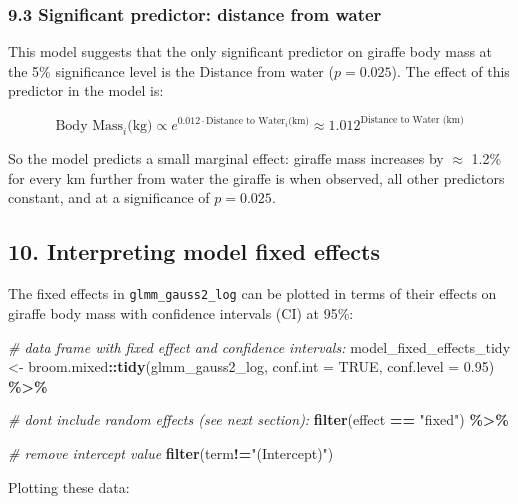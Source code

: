 \documentclass[
]{article}
\newenvironment{Shaded}{\begin{snugshade}}{\end{snugshade}}
\newcommand{\AttributeTok}[1]{\textcolor[rgb]{0.13,0.29,0.53}{#1}}
\newcommand{\CommentTok}[1]{\textcolor[rgb]{0.56,0.35,0.01}{\textit{#1}}}
\newcommand{\ConstantTok}[1]{\textcolor[rgb]{0.56,0.35,0.01}{#1}}
\newcommand{\FloatTok}[1]{\textcolor[rgb]{0.00,0.00,0.81}{#1}}
\newcommand{\FunctionTok}[1]{\textcolor[rgb]{0.13,0.29,0.53}{\textbf{#1}}}
\newcommand{\NormalTok}[1]{#1}
\newcommand{\OtherTok}[1]{\textcolor[rgb]{0.56,0.35,0.01}{#1}}
\newcommand{\SpecialCharTok}[1]{\textcolor[rgb]{0.81,0.36,0.00}{\textbf{#1}}}
\newcommand{\StringTok}[1]{\textcolor[rgb]{0.31,0.60,0.02}{#1}}
\begin{document}
\subsubsection{9.3 Significant predictor: distance from
water}\label{significant-predictor-distance-from-water}

This model suggests that the only significant predictor on giraffe body
mass at the 5\% significance level is the Distance from water
(\(p = 0.025\)). The effect of this predictor in the model is:

\[
\text{Body Mass}_i\text{(kg)} \propto e^{0.012\cdot\text{Distance to Water}_{i}\text{(km)}} \approx 1.012^{\text{Distance to Water (km)}}
\]

So the model predicts a small marginal effect: giraffe mass increases by
\(\approx\) 1.2\% for every km further from water the giraffe is when
observed, all other predictors constant, and at a significance of
\(p = 0.025\).

\subsection{10. Interpreting model fixed
effects}\label{interpreting-model-fixed-effects}

The fixed effects in \texttt{glmm\_gauss2\_log} can be plotted in terms
of their effects on giraffe body mass with confidence intervals (CI) at
95\%:

\begin{Shaded}
\begin{Highlighting}[]
\CommentTok{\# data frame with fixed effect and confidence intervals:}
\NormalTok{model\_fixed\_effects\_tidy }\OtherTok{\textless{}{-}}\NormalTok{ broom.mixed}\SpecialCharTok{::}\FunctionTok{tidy}\NormalTok{(glmm\_gauss2\_log, }\AttributeTok{conf.int =} \ConstantTok{TRUE}\NormalTok{, }\AttributeTok{conf.level =} \FloatTok{0.95}\NormalTok{) }\SpecialCharTok{\%\textgreater{}\%}
  
  \CommentTok{\# don\textquotesingle{}t include random effects (see next section):}
  \FunctionTok{filter}\NormalTok{(effect }\SpecialCharTok{==} \StringTok{"fixed"}\NormalTok{) }\SpecialCharTok{\%\textgreater{}\%}
  
  \CommentTok{\# remove intercept value}
  \FunctionTok{filter}\NormalTok{(term}\SpecialCharTok{!=}\StringTok{"(Intercept)"}\NormalTok{)}
\end{Highlighting}
\end{Shaded}

Plotting these data:
\end{document}
